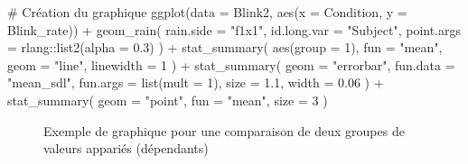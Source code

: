 \documentclass[
  letterpaper,
]{book}
\newenvironment{Shaded}{\begin{snugshade}}{\end{snugshade}}
\newcommand{\AttributeTok}[1]{\textcolor[rgb]{0.40,0.45,0.13}{#1}}
\newcommand{\CommentTok}[1]{\textcolor[rgb]{0.37,0.37,0.37}{#1}}
\newcommand{\DecValTok}[1]{\textcolor[rgb]{0.68,0.00,0.00}{#1}}
\newcommand{\FloatTok}[1]{\textcolor[rgb]{0.68,0.00,0.00}{#1}}
\newcommand{\FunctionTok}[1]{\textcolor[rgb]{0.28,0.35,0.67}{#1}}
\newcommand{\NormalTok}[1]{\textcolor[rgb]{0.00,0.23,0.31}{#1}}
\newcommand{\SpecialCharTok}[1]{\textcolor[rgb]{0.37,0.37,0.37}{#1}}
\newcommand{\StringTok}[1]{\textcolor[rgb]{0.13,0.47,0.30}{#1}}
\begin{document}
\begin{Shaded}
\begin{Highlighting}[]
\CommentTok{\# Création du graphique}
\FunctionTok{ggplot}\NormalTok{(}\AttributeTok{data =}\NormalTok{ Blink2, }\FunctionTok{aes}\NormalTok{(}\AttributeTok{x =}\NormalTok{ Condition, }\AttributeTok{y =}\NormalTok{ Blink\_rate)) }\SpecialCharTok{+}
  \FunctionTok{geom\_rain}\NormalTok{(}
    \AttributeTok{rain.side =} \StringTok{"f1x1"}\NormalTok{,}
    \AttributeTok{id.long.var =} \StringTok{"Subject"}\NormalTok{,}
    \AttributeTok{point.args =}\NormalTok{ rlang}\SpecialCharTok{::}\FunctionTok{list2}\NormalTok{(}\AttributeTok{alpha =} \FloatTok{0.3}\NormalTok{)}
\NormalTok{  ) }\SpecialCharTok{+}
  \FunctionTok{stat\_summary}\NormalTok{(}
    \FunctionTok{aes}\NormalTok{(}\AttributeTok{group =} \DecValTok{1}\NormalTok{),}
    \AttributeTok{fun =} \StringTok{"mean"}\NormalTok{,}
    \AttributeTok{geom =} \StringTok{"line"}\NormalTok{,}
    \AttributeTok{linewidth =} \DecValTok{1}
\NormalTok{  ) }\SpecialCharTok{+}
  \FunctionTok{stat\_summary}\NormalTok{(}
    \AttributeTok{geom =} \StringTok{"errorbar"}\NormalTok{,}
    \AttributeTok{fun.data =} \StringTok{"mean\_sdl"}\NormalTok{,}
    \AttributeTok{fun.args =} \FunctionTok{list}\NormalTok{(}\AttributeTok{mult =} \DecValTok{1}\NormalTok{),}
    \AttributeTok{size =} \FloatTok{1.1}\NormalTok{, }
    \AttributeTok{width =} \FloatTok{0.06}
\NormalTok{    ) }\SpecialCharTok{+} 
  \FunctionTok{stat\_summary}\NormalTok{(}
    \AttributeTok{geom =} \StringTok{"point"}\NormalTok{,}
    \AttributeTok{fun =} \StringTok{"mean"}\NormalTok{, }
    \AttributeTok{size =} \DecValTok{3}
\NormalTok{    )}
\end{Highlighting}
\end{Shaded}

\begin{figure}[H]


\caption{\label{fig-raindcloudplotsBivPaired1}Exemple de graphique pour
une comparaison de deux groupes de valeurs appariés (dépendants)}

\end{figure}%
\end{document}
